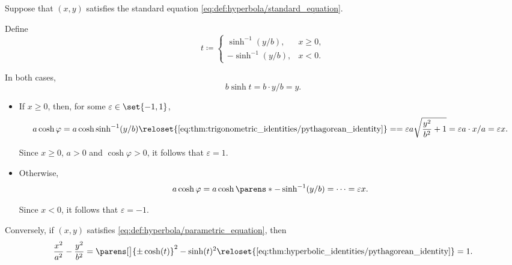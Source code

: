 \begin{defproof}
   Suppose that \( (x, y) \) satisfies the standard equation \eqref{eq:def:hyperbola/standard_equation}.

  Define
  \begin{equation*}
    t \coloneqq \begin{cases}
      \hyperref[eq:thm:hyperbolic_identities/inverse/sinh]{\sinh^{-1}}(y / b), &x \geq 0, \\
      -\sinh^{-1}(y / b),                                                      &x < 0.
    \end{cases}
  \end{equation*}

  In both cases,
  \begin{equation*}
    b \sinh t = b \cdot y / b = y.
  \end{equation*}

  \begin{itemize}
    \item If \( x \geq 0 \), then, for some \( \varepsilon \in \set{ -1, 1 } \),
    \begin{equation*}
      a \cosh\varphi
      =
      a \cosh\sinh^{-1}(y / b)
      \reloset {\eqref{eq:thm:trigonometric_identities/pythagorean_identity}} =
      =
      \varepsilon a \sqrt{ \frac {y^2} {b^2} + 1 }
      =
      \varepsilon a \cdot x / a
      =
      \varepsilon x.
    \end{equation*}

    Since \( x \geq 0 \), \( a > 0 \) and \( \cosh\varphi > 0 \), it follows that \( \varepsilon = 1 \).

    \item Otherwise,
    \begin{equation*}
      a \cosh\varphi
      =
      a \cosh\parens*{ -\sinh^{-1}(y / b) }
      =
      \cdots
      =
      \varepsilon x.
    \end{equation*}

    Since \( x < 0 \), it follows that \( \varepsilon = -1 \).
  \end{itemize}

   Conversely, if \( (x, y) \) satisfies \eqref{eq:def:hyperbola/parametric_equation}, then
  \begin{equation*}
    \frac {x^2} {a^2} - \frac {y^2} {b^2}
    =
    \parens[\big]{ \pm \cosh(t) }^2 - \sinh(t)^2
    \reloset {\eqref{eq:thm:hyperbolic_identities/pythagorean_identity}} =
    1.
  \end{equation*}


\end{defproof}
